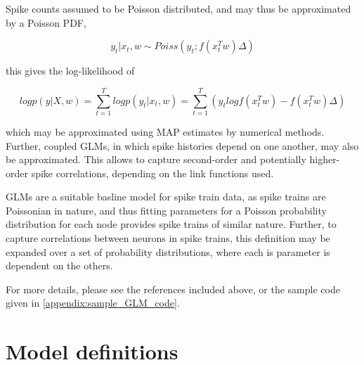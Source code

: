 \documentclass[mphil,deptreport,ianc]{infthesis} %
\begin{document}
\cite{Nelder1972, Fernandez2000}

Spike counts assumed to be Poisson distributed, and may thus be approximated by a Poisson PDF,

\begin{equation}
    y_t|x_t, w \sim Poiss(y_t; f(x_t^T w)\Delta)
\end{equation}

this gives the log-likelihood of

\begin{equation}
    log p(y|X, w) = \sum_{t=1}^T log p(y_t| x_t, w) = \sum_{t=1}^T(y_t log f(x_t^Tw) - f(x_t^Tw)\Delta)
\end{equation}

which may be approximated using MAP estimates by numerical methods.
Further, coupled GLMs, in which spike histories depend on one another, may also be approximated. This allows to capture second-order and potentially higher-order spike correlations, depending on the link functions used.

GLMs are a suitable basline model for spike train data, as spike trains are Poissonian in nature, and thus fitting parameters for a Poisson probability distribution for each node provides spike trains of similar nature.
Further, to capture correlations between neurons in spike trains, this definition may be expanded over a set of probability distributions, where each is parameter is dependent on the others.

For more details, please see the references included above, or the sample code given in \ref{appendix:sample_GLM_code}.



\section{Model definitions}
\end{document}
